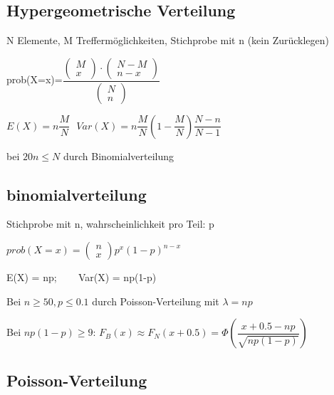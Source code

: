 \subsubsection*{}


\subsection*{Hypergeometrische Verteilung}
N Elemente, M Treffermöglichkeiten, Stichprobe mit n (kein Zurücklegen)

prob(X=x)=$ \dfrac{\left( \! \begin{array}{c}M \\ x \end{array} \! \right) \cdot \left( \begin{array}{c}N-M \\ n-x \end{array}  \right) }{\left( \begin{array}{c}N \\ n \end{array}  \right) }$

$E(X)=n\dfrac{M}{N}~~~
Var(X) = n\dfrac{M}{N} \left( 1- \dfrac{M}{N} \right) \dfrac{N-n}{N-1}
$

\Naeherung bei $ 20 n \leq N $  durch Binomialverteilung

\subsection*{binomialverteilung}
Stichprobe mit n, wahrscheinlichkeit pro Teil: p 

$prob(X=x) = \left( \begin{array}{c} n \\ x \end{array} \right) p^x (1-p)^{n-x}$

E(X) = np; ~~~ Var(X) = np(1-p)


\Naeherung  Bei $n \geq 50, p \leq 0.1 $ durch Poisson-Verteilung mit $\lambda = np$

\Naeherung Bei $np(1-p)\geq 9$: $F_B(x) \approx F_N(x+0.5) = \Phi \left( \dfrac{x+0.5 -np}{\sqrt{np(1-p)}}\right)$


\subsection*{Poisson-Verteilung}


